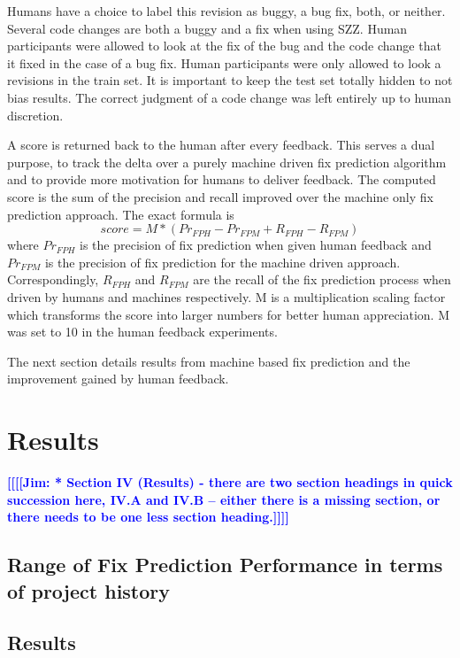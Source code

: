 \documentclass[10pt, conference, letterpaper, compsocconf]{IEEEtran}
\newcommand{\todoc}[2]{{\textcolor{#1} {\textbf{[[#2]]}}}}
\newcommand{\todoblue}[1]{\todoc{blue}{\textbf{[[#1]]}}}
\newcommand{\jim}[1]{\todoblue{Jim: #1}}
\begin{document}
Humans have a choice to label this revision as buggy, a bug fix, both, or neither.
Several code changes are both a buggy and a fix when using SZZ.
Human participants were allowed to look at the fix of the bug and the code change that it fixed in the case of a bug fix.
Human participants were only allowed to look a revisions in the train set. It is important to keep the test set totally hidden to not bias results.
The correct judgment of a code change was left entirely up to human discretion.

A score is returned back to the human after every feedback.
This serves a dual purpose, to track the delta over a purely machine driven fix prediction algorithm
and to provide more motivation for humans to deliver feedback.
The computed score is the sum of the precision and recall improved over the machine only fix prediction approach.
The exact formula is $$score = M* (Pr_{FPH} - Pr_{FPM} + R_{FPH} - R_{FPM}) $$ where $Pr_{FPH}$
is the precision of fix prediction when given human feedback and $Pr_{FPM}$
is the precision of fix prediction for the machine driven approach.
Correspondingly, $R_{FPH}$ and $R_{FPM}$ are the recall of the fix prediction process when driven by humans and machines respectively.
M is a multiplication scaling factor which transforms the score into larger numbers
for better human appreciation. M was set to 10 in the human feedback experiments.

The next section details results from machine based fix prediction and the improvement gained by human feedback.

\section{Results}
\label{Results}
\jim{* Section IV (Results) - there are two section headings in quick succession here, IV.A and IV.B -- either there is a missing section, or there needs to be one less section heading.}


\subsection{Range of Fix Prediction Performance in terms of project history}

\label{RangeFixPredictionPerformanceResult}
\subsection{Results}
\end{document}
